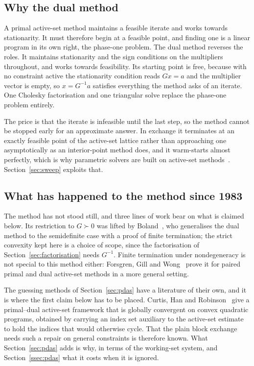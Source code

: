 \subsection{Why the dual method}

A primal active-set method maintains a feasible iterate and works towards
stationarity. It must therefore begin at a feasible point, and finding one is a
linear program in its own right, the phase-one problem. The dual method
reverses the roles. It maintains stationarity and the sign conditions on the
multipliers throughout, and works towards feasibility. Its starting point is
free, because with no constraint active the stationarity condition reads
$Gx = a$ and the multiplier vector is empty, so $x = G^{-1}a$ satisfies
everything the method asks of an iterate. One Cholesky factorisation and one
triangular solve replace the phase-one problem entirely.

The price is that the iterate is infeasible until the last step, so the method
cannot be stopped early for an approximate answer. In exchange it terminates at
an exactly feasible point of the active-set lattice rather than approaching one
asymptotically as an interior-point method does, and it warm-starts almost
perfectly, which is why parametric solvers are built on active-set
methods~\cite{nocedal2006}. Section~\ref{sec:sweep} exploits that.

\subsection{What has happened to the method since 1983}
\label{ssec:related}

The method has not stood still, and three lines of work bear on what is claimed
below. Its restriction to $G \succ 0$ was lifted by Boland~\cite{boland1997}, who
generalises the dual method to the semidefinite case with a proof of finite
termination; the strict convexity kept here is a choice of scope, since the
factorisation of Section~\ref{sec:factorisation} needs $G^{-1}$. Finite termination
under nondegeneracy is not special to this method either: Forsgren, Gill and
Wong~\cite{forsgren2016} prove it for paired primal and dual active-set methods in
a more general setting.

The guessing methods of Section~\ref{sec:pdas} have a literature of their own, and
it is where the first claim below has to be placed. Curtis, Han and
Robinson~\cite{curtis2015pdas} give a primal--dual active-set framework that is
globally convergent on convex quadratic programs, obtained by carrying an index set
auxiliary to the active-set estimate to hold the indices that would otherwise
cycle. That the plain block exchange needs such a repair on general constraints is
therefore known. What Section~\ref{sec:pdas} adds is why, in terms of the
working-set system, and Section~\ref{ssec:pdas} what it costs when it is ignored.

